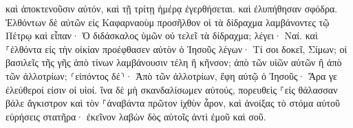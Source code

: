\documentclass{openreader}
\begin{document}
καὶ ἀποκτενοῦσιν αὐτόν, καὶ τῇ τρίτῃ ἡμέρᾳ ἐγερθήσεται. καὶ ἐλυπήθησαν σφόδρα. 
Ἐλθόντων δὲ αὐτῶν εἰς Καφαρναοὺμ προσῆλθον οἱ τὰ δίδραχμα λαμβάνοντες τῷ Πέτρῳ καὶ εἶπαν· Ὁ διδάσκαλος ὑμῶν οὐ τελεῖ τὰ δίδραχμα; 
λέγει· Ναί. καὶ ⸀ἐλθόντα εἰς τὴν οἰκίαν προέφθασεν αὐτὸν ὁ Ἰησοῦς λέγων· Τί σοι δοκεῖ, Σίμων; οἱ βασιλεῖς τῆς γῆς ἀπὸ τίνων λαμβάνουσιν τέλη ἢ κῆνσον; ἀπὸ τῶν υἱῶν αὐτῶν ἢ ἀπὸ τῶν ἀλλοτρίων; 
⸂εἰπόντος δέ⸃· Ἀπὸ τῶν ἀλλοτρίων, ἔφη αὐτῷ ὁ Ἰησοῦς· Ἄρα γε ἐλεύθεροί εἰσιν οἱ υἱοί. 
ἵνα δὲ μὴ σκανδαλίσωμεν αὐτούς, πορευθεὶς ⸀εἰς θάλασσαν βάλε ἄγκιστρον καὶ τὸν ⸀ἀναβάντα πρῶτον ἰχθὺν ἆρον, καὶ ἀνοίξας τὸ στόμα αὐτοῦ εὑρήσεις στατῆρα· ἐκεῖνον λαβὼν δὸς αὐτοῖς ἀντὶ ἐμοῦ καὶ σοῦ. 
\end{document}
